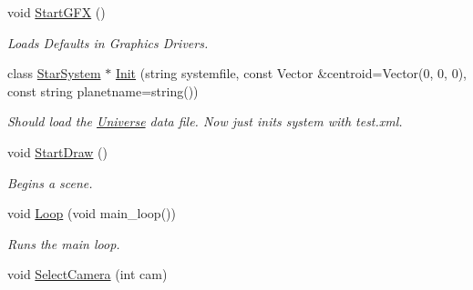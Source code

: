 \begin{DoxyCompactItemize}
\item 
void \hyperlink{classGameUniverse_a15e30010b9d79ae5d247fe4796302738}{Start\+G\+FX} ()\hypertarget{classGameUniverse_a15e30010b9d79ae5d247fe4796302738}{}\label{classGameUniverse_a15e30010b9d79ae5d247fe4796302738}

\begin{DoxyCompactList}\small\item\em Loads Defaults in Graphics Drivers. \end{DoxyCompactList}\item 
class \hyperlink{classStarSystem}{Star\+System} $\ast$ \hyperlink{classGameUniverse_a498907a74126272d0339303cb8ff31ed}{Init} (string systemfile, const Vector \&centroid=Vector(0, 0, 0), const string planetname=string())\hypertarget{classGameUniverse_a498907a74126272d0339303cb8ff31ed}{}\label{classGameUniverse_a498907a74126272d0339303cb8ff31ed}

\begin{DoxyCompactList}\small\item\em Should load the \hyperlink{classUniverse}{Universe} data file. Now just inits system with test.\+xml. \end{DoxyCompactList}\item 
void \hyperlink{classGameUniverse_a03a60a21ff73d975b9d5e176c27fb26d}{Start\+Draw} ()\hypertarget{classGameUniverse_a03a60a21ff73d975b9d5e176c27fb26d}{}\label{classGameUniverse_a03a60a21ff73d975b9d5e176c27fb26d}

\begin{DoxyCompactList}\small\item\em Begins a scene. \end{DoxyCompactList}\item 
void \hyperlink{classGameUniverse_aaddabc56fbce3070ec1029cbb6a57012}{Loop} (void main\+\_\+loop())\hypertarget{classGameUniverse_aaddabc56fbce3070ec1029cbb6a57012}{}\label{classGameUniverse_aaddabc56fbce3070ec1029cbb6a57012}

\begin{DoxyCompactList}\small\item\em Runs the main loop. \end{DoxyCompactList}\item 
void \hyperlink{classGameUniverse_aa9cfc73e3cf569a0f5822e335f777582}{Select\+Camera} (int cam)\hypertarget{classGameUniverse_aa9cfc73e3cf569a0f5822e335f777582}{}\label{classGameUniverse_aa9cfc73e3cf569a0f5822e335f777582}


\end{DoxyCompactItemize}
